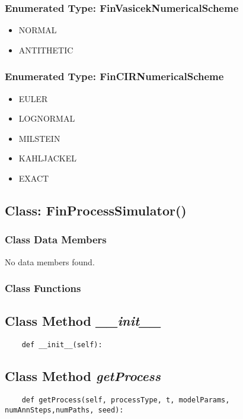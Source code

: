 \documentclass[twoside,11pt]{book}
\begin{document}
\subsubsection{Enumerated Type: FinVasicekNumericalScheme}
\begin{itemize}
\item{NORMAL}
\item{ANTITHETIC}
\end{itemize}

\subsubsection{Enumerated Type: FinCIRNumericalScheme}
\begin{itemize}
\item{EULER}
\item{LOGNORMAL}
\item{MILSTEIN}
\item{KAHLJACKEL}
\item{EXACT}
\end{itemize}

\subsection{Class: FinProcessSimulator()}


\subsubsection{Class Data Members}
No data members found.

\subsubsection{Class Functions}

\subsection{Class Method {\it \_\_init\_\_}}


\begin{lstlisting}
    def __init__(self):
\end{lstlisting}

\subsection{Class Method {\it getProcess}}


\begin{lstlisting}
    def getProcess(self, processType, t, modelParams, numAnnSteps,numPaths, seed):
\end{lstlisting}
\end{document}
